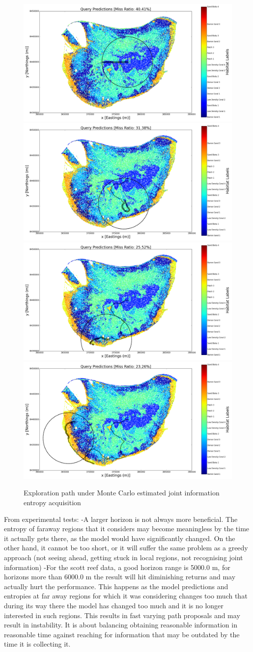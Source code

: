 \documentclass{article}
\begin{document}
\begin{figure}[!htbp]
			\includegraphics[width = 0.24\linewidth]{Figures/location_1_mcje_path/pred_propose_step1.png}
			\includegraphics[width = 0.24\linewidth]{Figures/location_1_mcje_path/pred_propose_step50.png}
			\includegraphics[width = 0.24\linewidth]{Figures/location_1_mcje_path/pred_propose_step100.png}
			\includegraphics[width = 0.24\linewidth]{Figures/location_1_mcje_path/pred_propose_step200.png}			
		\caption{Exploration path under Monte Carlo estimated joint information entropy acquisition}
		\label{Figure:Results:OptimalPathMCJE}
		\end{figure}
			
		From experimental tests:
			-A larger horizon is not always more beneficial. The entropy of faraway regions that it considers may become meaningless by the time it actually gets there, as the model would have significantly changed. On the other hand, it cannot be too short, or it will suffer the same problem as a greedy approach (not seeing ahead, getting stuck in local regions, not recognising joint information)
			-For the scott reef data, a good horizon range is 5000.0 m, for horizons more than 6000.0 m the result will hit diminishing returns and may actually hurt the performance. This happens as the model predictions and entropies at far away regions for which it was considering changes too much that during its way there the model has changed too much and it is no longer interested in such regions. This results in fast varying path proposals and may result in instability. It is about balancing obtaining reasonable information in reasonable time against reaching for information that may be outdated by the time it is collecting it.
			
\end{document}
